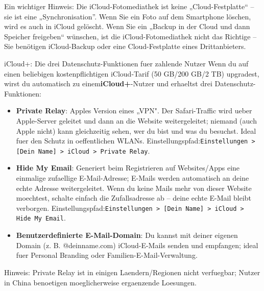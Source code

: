 Ein wichtiger Hinweis: Die iCloud-Fotomediathek ist keine „Cloud-Festplatte“ – sie ist eine „Synchronisation”. Wenn Sie ein Foto auf dem Smartphone löschen, wird es auch in iCloud gelöscht. Wenn Sie ein „Backup in der Cloud und dann Speicher freigeben“ wünschen, ist die iCloud-Fotomediathek nicht das Richtige – Sie benötigen iCloud-Backup oder eine Cloud-Festplatte eines Drittanbieters.

\begin{tcbinfo}{iCloud+: Die drei Datenschutz-Funktionen fuer zahlende Nutzer}
Wenn du auf einen beliebigen kostenpflichtigen iCloud-Tarif (50 GB/200 GB/2 TB) upgradest, wirst du automatisch zu einem\textbf{iCloud+}-Nutzer und erhaeltst drei Datenschutz-Funktionen:

\begin{itemize}
  \item \textbf{Private Relay}: Apples Version eines „VPN". Der Safari-Traffic wird ueber Apple-Server geleitet und dann an die Website weitergeleitet; niemand (auch Apple nicht) kann gleichzeitig sehen, wer du bist und was du besuchst. Ideal fuer den Schutz in oeffentlichen WLANs. Einstellungspfad:\texttt{Einstellungen > [Dein Name] > iCloud > Private Relay}.
  \item \textbf{Hide My Email}: Generiert beim Registrieren auf Websites/Apps eine einmalige zufaellige E-Mail-Adresse; E-Mails werden automatisch an deine echte Adresse weitergeleitet. Wenn du keine Mails mehr von dieser Website moechtest, schalte einfach die Zufallsadresse ab – deine echte E-Mail bleibt verborgen. Einstellungspfad:\texttt{Einstellungen > [Dein Name] > iCloud > Hide My Email}.
  \item \textbf{Benutzerdefinierte E-Mail-Domain}: Du kannst mit deiner eigenen Domain (z. B. @deinname.com) iCloud-E-Mails senden und empfangen; ideal fuer Personal Branding oder Familien-E-Mail-Verwaltung.
\end{itemize}

Hinweis: Private Relay ist in einigen Laendern/Regionen nicht verfuegbar; Nutzer in China benoetigen moeglicherweise ergaenzende Loesungen.

\end{tcbinfo}

